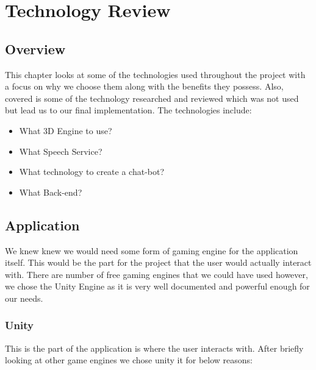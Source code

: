 \chapter{Technology Review}
\section{Overview}
This chapter looks at some of the technologies used throughout the project with a focus on why we choose them along with the benefits they possess. Also, covered is some of the technology researched and reviewed which was not used but lead us to our final implementation. The technologies include:

\begin{itemize}
    \item What 3D Engine to use?
    \item What Speech Service?
    \item What technology to create a chat-bot?
    \item What Back-end?
\end{itemize}

\section{Application}
We knew knew we would need some form of gaming engine for the application itself. This would be the part for the project that the user would actually interact with. There are number of free gaming engines that we could have used however, we chose the Unity Engine as it is very well documented and powerful enough for our needs.

\subsection{Unity}
This is the part of the application is where the user interacts with. After briefly looking at other game engines we chose unity it for below reasons:

